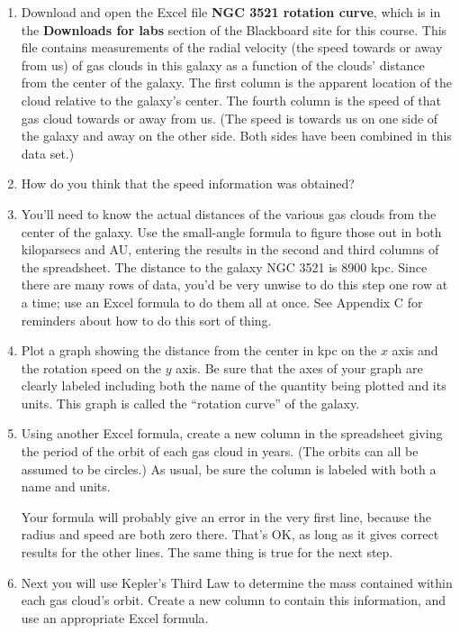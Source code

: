 \begin{enumerate}

\item Download and open the Excel file {\bf NGC 3521 rotation curve},
which is in the {\bf Downloads for labs} section of the Blackboard
site for this course.  This file contains measurements of the
radial velocity (the speed towards or away from us) of gas clouds
in this galaxy as a function of the clouds' distance from the center
of the galaxy.  The first column is the apparent location of the cloud
relative to the galaxy's center.  The fourth column is the speed
of that gas cloud towards or away from us.  (The speed is towards
us on one side of the galaxy and away on the other side.  Both
sides have been combined in this data set.)

\item How do you think that the speed information was obtained?

\vskip 1in

\item You'll need to know the actual distances of the various gas clouds
from the center of the galaxy.  Use the small-angle formula to figure
those out in both kiloparsecs and AU, entering the results in the
second and third columns of the spreadsheet.  The distance to the
galaxy NGC 3521 is 8900 kpc.  Since there are many rows of data, you'd
be very unwise to do this step one row at a time; use an Excel formula
to do them all at once.  See Appendix C for reminders about how to do this sort
of thing.

\item Plot a graph showing the distance from the center in kpc on the
$x$ axis and the rotation speed on the $y$ axis.  Be sure that
the axes of your graph are clearly labeled including both the
name of the quantity being plotted and its units.  This graph
is called the ``rotation curve'' of the galaxy.

\item Using another Excel formula, 
create a new column in the spreadsheet giving the period
of the orbit of each gas cloud in years.  (The orbits can
all be assumed to be circles.)  As usual, be sure the column
is labeled with both a name and units.

Your formula will probably give an error in the very first line,
because the radius and speed are both zero there.  That's OK,
as long as it gives correct results for the other lines.  The
same thing is true for the next step.

\item Next you will use Kepler's Third Law to determine the mass contained
within each gas cloud's orbit.  Create a new column to contain
this information, and use an appropriate Excel formula.


\end{enumerate}
